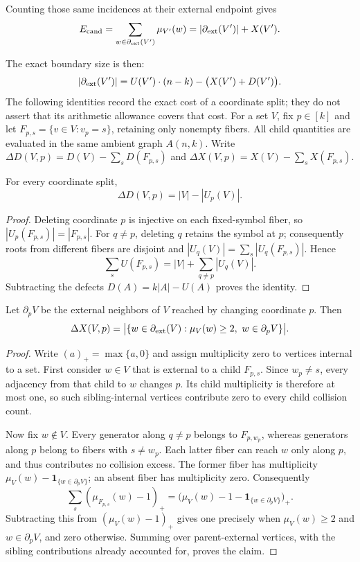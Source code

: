 Counting those same incidences at their external endpoint gives
\[E_{\mathrm{cand}}
=\sum_{w\in\partial_{\mathrm{ext}}(V')}\mu_{V'}(w)
=|\partial_{\mathrm{ext}}(V')|+X(V').\]

The exact boundary size is then:
\begin{equation}\label{eq:boundary}
	\left| \partial_{\mathrm{ext}}(V') \right| = U(V') \cdot (n - k) - \big(X(V') + D(V')\big).
\end{equation}
The following identities record the exact cost of a coordinate split;
they do not assert that its arithmetic allowance covers that cost.
For a set $V$, fix $p\in[k]$ and let
$F_{p,s}=\{v\in V:v_p=s\}$, retaining only nonempty fibers.
All child quantities are evaluated in the same ambient graph $A(n,k)$.
Write $\Delta D(V,p)=D(V)-\sum_s D(F_{p,s})$ and
$\Delta X(V,p)=X(V)-\sum_s X(F_{p,s})$.

\begin{lemma}
\label{lem:exact_defect_increment}
For every coordinate split,
\[
 \Delta D(V,p)=|V|-|U_p(V)|.
\]
\end{lemma}
\begin{proof}
Deleting coordinate $p$ is injective on each fixed-symbol fiber, so
$|U_p(F_{p,s})|=|F_{p,s}|$.  For $q\ne p$, deleting $q$ retains
the symbol at $p$; consequently roots from different fibers are disjoint and
$|U_q(V)|=\sum_s|U_q(F_{p,s})|$.  Hence
\[
 \sum_s U(F_{p,s})=|V|+\sum_{q\ne p}|U_q(V)|.
\]
Subtracting the defects $D(A)=k|A|-U(A)$ proves the identity.
\end{proof}

\begin{lemma}
\label{lem:exact_collision_increment}
Let $\partial_p V$ be the external neighbors of $V$ reached by changing
coordinate $p$.  Then
\[
 \Delta X(V,p)=
 \bigl|\{w\in\partial_{\mathrm{ext}}(V):\mu_V(w)\ge2,
                  \ w\in\partial_p V\}\bigr|.
\]
\end{lemma}
\begin{proof}
Write $(a)_+=\max\{a,0\}$ and assign multiplicity zero to vertices
internal to a set.  First consider $w\in V$ that is external to a child
$F_{p,s}$.  Since $w_p\ne s$, every adjacency from that child to $w$
changes $p$.  Its child multiplicity is therefore at most one, so
such sibling-internal vertices contribute zero to every child collision count.

Now fix $w\notin V$.  Every generator along $q\ne p$ belongs to
$F_{p,w_p}$, whereas generators along $p$ belong to fibers with
$s\ne w_p$.  Each latter fiber can reach $w$ only along $p$, and thus
contributes no collision excess.  The former fiber has multiplicity
$\mu_V(w)-\mathbf{1}_{\{w\in\partial_p V\}}$; an absent fiber has
multiplicity zero.  Consequently
\[
 \sum_s(\mu_{F_{p,s}}(w)-1)_+
 =\bigl(\mu_V(w)-1-\mathbf{1}_{\{w\in\partial_p V\}}\bigr)_+.
\]
Subtracting this from $(\mu_V(w)-1)_+$ gives one precisely when
$\mu_V(w)\ge2$ and $w\in\partial_p V$, and zero otherwise.
Summing over parent-external vertices, with the sibling contributions
already accounted for, proves the claim.
\end{proof}

